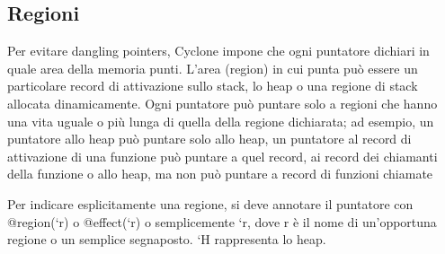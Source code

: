 \subsection{Regioni}
\label{sec:regions}
Per evitare dangling pointers, Cyclone impone che ogni puntatore dichiari in quale area della
memoria punti. L’area (region) in cui punta può essere un particolare record di attivazione
sullo stack, lo heap o una regione di stack allocata dinamicamente. Ogni puntatore può puntare
solo a regioni che hanno una vita uguale o più lunga di quella della regione dichiarata; ad
esempio, un puntatore allo heap può puntare solo allo heap, un puntatore al record di
attivazione di una funzione può puntare a quel record, ai record dei chiamanti della funzione o
allo heap, ma non può puntare a record di funzioni chiamate

Per indicare esplicitamente una regione, si deve annotare il puntatore con @region(`r) o
@effect(`r) o semplicemente `r, dove r è il nome di un’opportuna regione o un semplice
segnaposto. `H rappresenta lo heap.